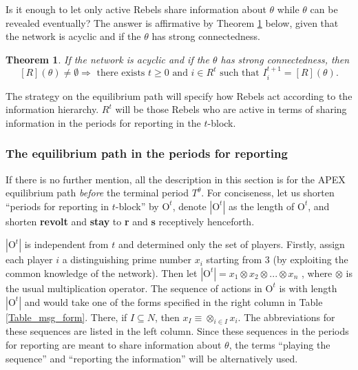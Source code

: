 \documentclass[12pt,letter]{article}
\newcommand{\Omicron}{\mathrm{O}}
\newtheorem{theorem}{Theorem}
\theoremstyle{definition}
\theoremstyle{remark}
\theoremstyle{claim}
\begin{document}
Is it enough to let only active Rebels share information about $\theta$ while $\theta$ can be revealed eventually? The answer is affirmative by Theorem \ref{lemma_empty} below, given that the network is acyclic and if the $\theta$ has strong connectedness.
\begin{theorem}
\label{lemma_empty}
If the network is acyclic and if the $\theta$ has strong connectedness, then 
\[[R](\theta)\neq \emptyset \Rightarrow \text{ there exists } t\geq 0 \text{ and } i\in R^t \text{ such that }I^{t+1}_i=[R](\theta).\] 
\end{theorem}


The strategy on the equilibrium path will specify how Rebels act according to the information hierarchy. $R^t$ will be those Rebels who are active in terms of sharing information in the periods for reporting in the $t$-block. 

\subsubsection{The equilibrium path in the periods for reporting}
\label{sec:eq_rp}
If there is no further mention, all the description in this section is for the APEX equilibrium path \textit{before} the terminal period $T^{\theta}$. For conciseness, let us shorten ``periods for reporting in $t$-block'' by $\Omicron^{t}$, denote $|\Omicron^t|$ as the length of $\Omicron^{t}$, and shorten \textbf{revolt} and \textbf{stay} to \textbf{r} and \textbf{s} receptively henceforth. 

$|\Omicron^{t}|$ is independent from $t$ and determined only the set of players. Firstly, assign each player $i$ a distinguishing prime number $x_i$ starting from $3$ (by exploiting the common knowledge of the network). Then let $|\Omicron^{t}|=x_1\otimes x_2\otimes...\otimes x_n$ , where $\otimes$ is the usual multiplication operator. The sequence of actions in $\Omicron^{t}$ is with length $|\Omicron^t|$ and would take one of the forms specified in the right column in Table \ref{Table_msg_form}. There, if $I\subseteq N$, then $x_{I}\equiv \otimes_{i\in I}x_i$. The abbreviations for these sequences are listed in the left column. Since these sequences in the periods for reporting are meant to share information about $\theta$, the terms ``playing the sequence'' and ``reporting the information'' will be alternatively used.
\end{document}
